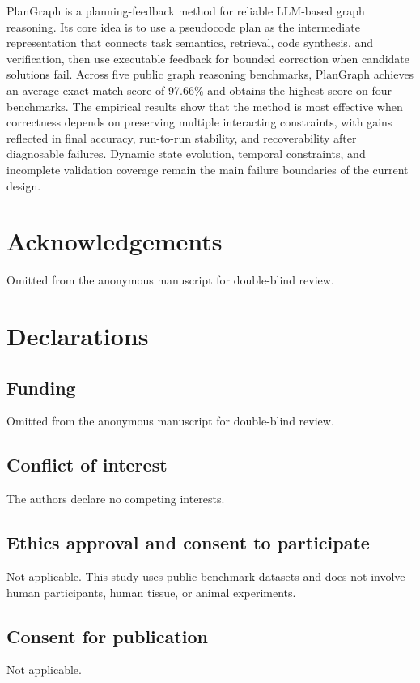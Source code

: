 \documentclass[pdflatex,sn-mathphys-num]{sn-jnl}
\theoremstyle{thmstyleone}
\theoremstyle{thmstyletwo}
\theoremstyle{thmstylethree}
\begin{document}
PlanGraph is a planning-feedback method for reliable LLM-based graph reasoning. Its core idea is to use a pseudocode plan as the intermediate representation that connects task semantics, retrieval, code synthesis, and verification, then use executable feedback for bounded correction when candidate solutions fail. Across five public graph reasoning benchmarks, PlanGraph achieves an average exact match score of 97.66\% and obtains the highest score on four benchmarks. The empirical results show that the method is most effective when correctness depends on preserving multiple interacting constraints, with gains reflected in final accuracy, run-to-run stability, and recoverability after diagnosable failures. Dynamic state evolution, temporal constraints, and incomplete validation coverage remain the main failure boundaries of the current design.

\backmatter

\section*{Acknowledgements}
Omitted from the anonymous manuscript for double-blind review.

\section*{Declarations}

\subsection*{Funding}
Omitted from the anonymous manuscript for double-blind review.

\subsection*{Conflict of interest}
The authors declare no competing interests.

\subsection*{Ethics approval and consent to participate}
Not applicable. This study uses public benchmark datasets and does not involve human participants, human tissue, or animal experiments.

\subsection*{Consent for publication}
Not applicable.
\end{document}
